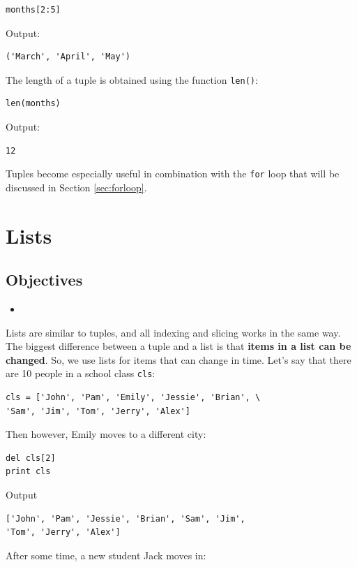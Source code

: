 \begin{verbatim}
months[2:5]
\end{verbatim}
Output:

\begin{verbatim}
('March', 'April', 'May')
\end{verbatim}
The length of a tuple is obtained using the function {\tt len()}:

\begin{verbatim}
len(months)
\end{verbatim}
Output:

\begin{verbatim}
12
\end{verbatim}
Tuples become especially useful in combination with the {\tt for}
loop that will be discussed in Section \ref{sec:forloop}. 

\section{Lists}

\subsection{Objectives}

\begin{itemize}
\item
\end{itemize}

\noindent
Lists are similar to tuples, and all indexing and slicing works in the same way. 
The biggest difference between a tuple 
and a list is that {\bf items in a list can be changed}. So, we use
lists for items that can change in time. Let's say that there are 
10 people in a school class {\tt cls}:

\begin{verbatim}
cls = ['John', 'Pam', 'Emily', 'Jessie', 'Brian', \
'Sam', 'Jim', 'Tom', 'Jerry', 'Alex']
\end{verbatim}
Then however, Emily moves to a different city:

\begin{verbatim}
del cls[2]
print cls
\end{verbatim}
Output

\begin{verbatim}
['John', 'Pam', 'Jessie', 'Brian', 'Sam', 'Jim', 
'Tom', 'Jerry', 'Alex']
\end{verbatim}
After some time, a new student Jack moves in:

